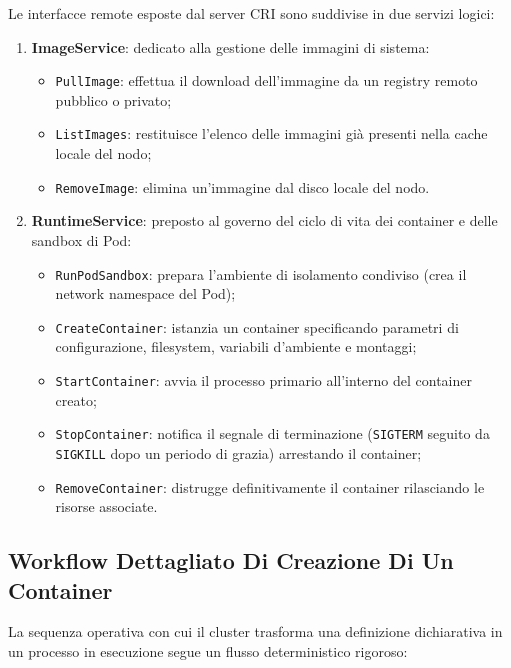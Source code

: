 \documentclass[11pt, a4paper]{article}
\begin{document}

Le interfacce remote esposte dal server CRI sono suddivise in due servizi logici:
\begin{enumerate}[noitemsep]
    \item \textbf{ImageService}: dedicato alla gestione delle immagini di sistema:
    \begin{itemize}[noitemsep]
        \item \texttt{PullImage}: effettua il download dell'immagine da un registry remoto pubblico o privato;
        \item \texttt{ListImages}: restituisce l'elenco delle immagini già presenti nella cache locale del nodo;
        \item \texttt{RemoveImage}: elimina un'immagine dal disco locale del nodo.
    \end{itemize}
    \item \textbf{RuntimeService}: preposto al governo del ciclo di vita dei container e delle sandbox di Pod:
    \begin{itemize}[noitemsep]
        \item \texttt{RunPodSandbox}: prepara l'ambiente di isolamento condiviso (crea il network namespace del Pod);
        \item \texttt{CreateContainer}: istanzia un container specificando parametri di configurazione, filesystem, variabili d'ambiente e montaggi;
        \item \texttt{StartContainer}: avvia il processo primario all'interno del container creato;
        \item \texttt{StopContainer}: notifica il segnale di terminazione (\texttt{SIGTERM} seguito da \texttt{SIGKILL} dopo un periodo di grazia) arrestando il container;
        \item \texttt{RemoveContainer}: distrugge definitivamente il container rilasciando le risorse associate.
    \end{itemize}
\end{enumerate}

\subsection{Workflow Dettagliato Di Creazione Di Un Container}
La sequenza operativa con cui il cluster trasforma una definizione dichiarativa in un processo in esecuzione segue un flusso deterministico rigoroso:
\end{document}
